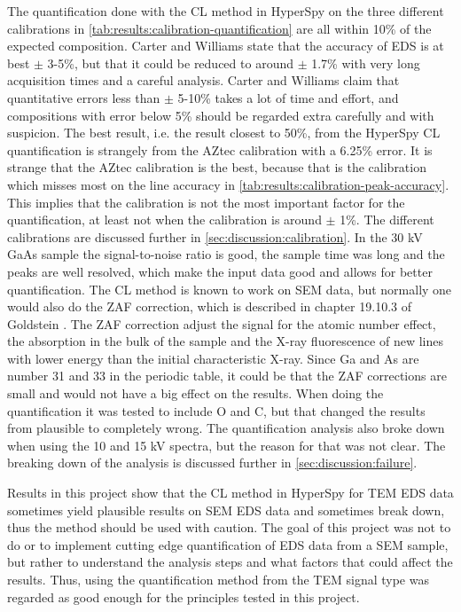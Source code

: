 The quantification done with the CL method in HyperSpy on the three different calibrations in \cref{tab:results:calibration-quantification} are all within 10\% of the expected composition.
Carter and Williams \cite[p. 612 and 648]{carter2016transmission} state that the accuracy of EDS is at best $\pm$ 3-5\%, but that it could be reduced to around $\pm$ 1.7\% with very long acquisition times and a careful analysis.
Carter and Williams claim that quantitative errors less than $\pm$ 5-10\% takes a lot of time and effort, and compositions with error below 5\% should be regarded extra carefully and with suspicion.
The best result, i.e. the result closest to 50\%, from the HyperSpy CL quantification is strangely from the AZtec calibration with a 6.25\% error.
It is strange that the AZtec calibration is the best, because that is the calibration which misses most on the line accuracy in \cref{tab:results:calibration-peak-accuracy}.
This implies that the calibration is not the most important factor for the quantification, at least not when the calibration is around $\pm$ 1\%.
The different calibrations are discussed further in \cref{sec:discussion:calibration}.
In the 30 kV GaAs sample the signal-to-noise ratio is good, the sample time was long and the peaks are well resolved, which make the input data good and allows for better quantification.
The CL method is known to work on SEM data, but normally one would also do the ZAF correction, which is described in chapter 19.10.3 of Goldstein \cite{goldstein_scanning_2018}.
The ZAF correction adjust the signal for the atomic number effect, the absorption in the bulk of the sample and the X-ray fluorescence of new lines with lower energy than the initial characteristic X-ray.
Since Ga and As are number 31 and 33 in the periodic table, it could be that the ZAF corrections are small and would not have a big effect on the results.
When doing the quantification it was tested to include O and C, but that changed the results from plausible to completely wrong.
The quantification analysis also broke down when using the 10 and 15 kV spectra, but the reason for that was not clear.
The breaking down of the analysis is discussed further in \cref{sec:discussion:failure}.


Results in this project show that the CL method in HyperSpy for TEM EDS data sometimes yield plausible results on SEM EDS data and sometimes break down, thus the method should be used with caution.
The goal of this project was not to do or to implement cutting edge quantification of EDS data from a SEM sample, but rather to understand the analysis steps and what factors that could affect the results.
Thus, using the quantification method from the TEM signal type was regarded as good enough for the principles tested in this project.









